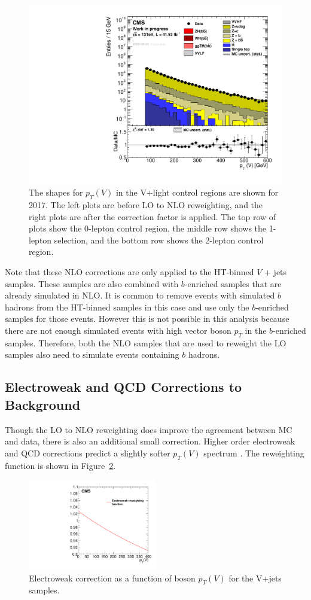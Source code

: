 \begin{figure}
  \includegraphics[width=0.45\linewidth]{figures/Vjets_NLOreweighting_2017V5_Zll_withWeight.pdf}
  \caption[LO to NLO reweighting shape comparisons]{
    The shapes for $p_T(V)$ in the V+light control regions are shown for 2017.
    The left plots are before LO to NLO reweighting,
    and the right plots are after the correction factor is applied.
    The top row of plots show the 0-lepton control region,
    the middle row shows the 1-lepton selection,
    and the bottom row shows the 2-lepton control region.
  }
  \label{fig:nlo-reweight}
\end{figure}

Note that these NLO corrections are only applied to the HT-binned $V$ + jets samples.
These samples are also combined with $b$-enriched samples that are already simulated in NLO.
It is common to remove events with simulated $b$ hadrons from the HT-binned samples in this case
and use only the $b$-enriched samples for those events.
However this is not possible in this analysis because there are not enough simulated events
with high vector boson $p_T$ in the $b$-enriched samples.
Therefore, both the NLO samples that are used to reweight the LO samples also need to
simulate events containing $b$ hadrons.

\subsection{Electroweak and QCD Corrections to Background}

Though the LO to NLO reweighting does improve the agreement between MC and data,
there is also an additional small correction.
Higher order electroweak and QCD corrections predict a slightly softer $p_T(V)$ spectrum
\cite{Kallweit_2016}.
The reweighting function is shown in Figure~\ref{fig:EWKcorr}.

\begin{figure}
  \centering
  \includegraphics[width=0.5\textwidth]{figures/EWKcorr.pdf}
  \caption[Electroweak corrections to background]{
    Electroweak correction as a function of boson $p_T(V)$ for the V+jets samples.
  }
  \label{fig:EWKcorr}
\end{figure}


